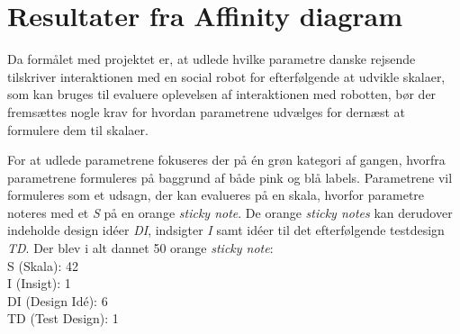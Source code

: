 \section{Resultater fra Affinity diagram}
\label{ParametreDatabehandlingAffinityDiagram}
%
%
Da formålet med projektet er, at udlede hvilke parametre danske rejsende tilskriver interaktionen med en social robot for efterfølgende at udvikle skalaer, som kan bruges til evaluere oplevelsen af interaktionen med robotten, bør der fremsættes nogle krav for hvordan parametrene udvælges for dernæst at formulere dem til skalaer. 

For at udlede parametrene fokuseres der på én grøn kategori af gangen, hvorfra parametrene formuleres på baggrund af både pink og blå labels. Parametrene vil formuleres som et udsagn, der kan evalueres på en skala, hvorfor parametre noteres med et \textit{S} på en orange \textit{sticky note}. De orange \textit{sticky notes} kan derudover indeholde design idéer \textit{DI}, indsigter \textit{I} samt idéer til det efterfølgende testdesign \textit{TD}. \blankline
%
Der blev i alt dannet 50 orange \textit{sticky note}: \\
S (Skala): 42\\
I (Insigt): 1\\
DI (Design Idé): 6\\
TD (Test Design): 1\\


